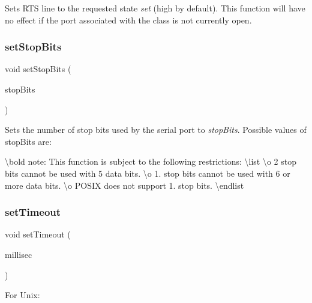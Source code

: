Sets R\+TS line to the requested state {\itshape set} (high by default). This function will have no effect if the port associated with the class is not currently open. \mbox{\label{class_qext_serial_port_aec0710cffb2bf37672b2ada711ea8857}} 
\subsubsection{\texorpdfstring{setStopBits}{setStopBits}}
{\footnotesize\ttfamily void set\+Stop\+Bits (\begin{DoxyParamCaption}\item[{Stop\+Bits\+Type}]{stop\+Bits }\end{DoxyParamCaption})\hspace{0.3cm}{\ttfamily [slot]}}

Sets the number of stop bits used by the serial port to {\itshape stop\+Bits}. Possible values of stop\+Bits are\+: 
\begin{DoxyCode}{0}
\end{DoxyCode}


\textbackslash{}bold note\+: This function is subject to the following restrictions\+: \textbackslash{}list \textbackslash{}o 2 stop bits cannot be used with 5 data bits. \textbackslash{}o 1. stop bits cannot be used with 6 or more data bits. \textbackslash{}o P\+O\+S\+IX does not support 1. stop bits. \textbackslash{}endlist \mbox{\label{class_qext_serial_port_adfedf676b5114c7372343c341fe6b8e4}} 
\subsubsection{\texorpdfstring{setTimeout}{setTimeout}}
{\footnotesize\ttfamily void set\+Timeout (\begin{DoxyParamCaption}\item[{long}]{millisec }\end{DoxyParamCaption})\hspace{0.3cm}{\ttfamily [slot]}}

For Unix\+:

